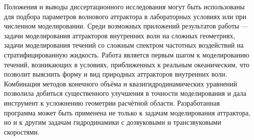 Положения и выводы диссертационного исследования могут быть использованы для подбора параметров  волнового аттрактора в лабораторных условиях или при численном моделировании. Среди возможных приложений результатов работы — задачи моделирования аттракторов внутренних волн на сложных геометриях, задачи моделирования течений со сложным спектром частотных воздействий на стратифицированную жидкость. Работа является первым шагом к моделированию течений, возникающих в условиях, приближенных к реальным океаническим, что позволит выяснить форму и вид природных аттракторов внутренних волн. Комбинация методов конечного объёма и квазигидродинамических уравнений позволила добиться существенного улучшения в точности моделирования и дала инструмент к  усложнению геометрии расчётной области. Разработанная программа может быть применена не только к задачам моделирования аттрактора, но и к другим задачам гидродинамики с дозвуковыми и трансзвуковыми скоростями.

